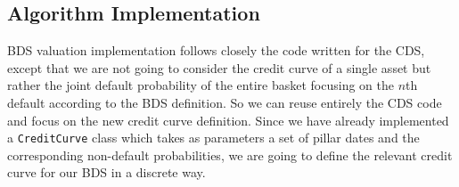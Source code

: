 \documentclass[]{article}
\begin{document}
\subsection{Algorithm Implementation}

BDS valuation implementation follows closely the code written for the CDS, except that we are not going to consider the credit curve of a single asset but rather the joint default probability of the entire basket focusing on the $n$th default according to the BDS definition.
So we can reuse entirely the CDS code and focus on the new credit curve definition.
Since we have already implemented a \texttt{CreditCurve} class which takes as parameters a set of pillar dates and the corresponding non-default probabilities, we are going to define the relevant credit curve for our BDS in a discrete way.
\end{document}
